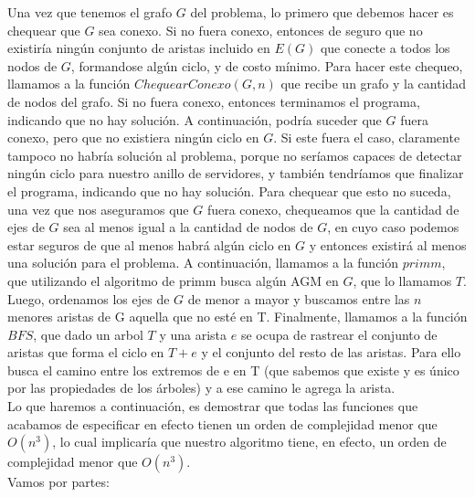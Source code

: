 \documentclass[11pt, a4paper, twoside]{article}
\begin{document}
Una vez que tenemos el grafo $G$ del problema, lo primero que debemos hacer es chequear que $G$
sea conexo. Si no fuera conexo, entonces de seguro que no existiría ningún conjunto de aristas
incluido en $E(G)$ que conecte a todos los nodos de $G$, formandose algún ciclo, y de costo 
mínimo. Para hacer este chequeo, llamamos a la función $ChequearConexo(G,n)$ que recibe un grafo
y la cantidad de nodos del grafo. Si no fuera conexo, entonces terminamos el programa, indicando
que no hay solución. A continuación, podría suceder que $G$ fuera conexo, pero que no existiera
ningún ciclo en $G$. Si este fuera el caso, claramente tampoco no habría solución al problema,
porque no seríamos capaces de detectar ningún ciclo para nuestro anillo de servidores, y también
tendríamos que finalizar el programa, indicando que no hay solución. Para 
chequear que esto no suceda, una vez que nos aseguramos que $G$ fuera conexo, chequeamos que
la cantidad de ejes de $G$ sea al menos igual a la cantidad de nodos de $G$, en cuyo caso podemos
estar seguros de que al menos habrá algún ciclo en $G$ y entonces existirá al menos una solución
para el problema. A continuación, llamamos a la función $primm$, que utilizando el algoritmo de
primm busca algún AGM en $G$, que lo llamamos $T$. Luego, ordenamos los ejes de $G$ de
menor a mayor y buscamos entre las $n$ menores aristas de G aquella que no esté en T. Finalmente, llamamos a la función $BFS$, que dado un arbol $T$ y una arista $e$ se ocupa de rastrear el conjunto de aristas que forma el ciclo en $T+e$ y el conjunto del resto de las aristas. Para ello busca el camino entre los extremos de e en T (que sabemos que existe y es único por las propiedades de los árboles) y a ese camino le agrega la arista.\\
Lo que haremos a continuación, es demostrar que todas las funciones que acabamos de especificar
en efecto tienen un orden de complejidad menor que $O(n^3)$, lo cual implicaría que nuestro
algoritmo tiene, en efecto, un orden de complejidad menor que $O(n^3)$. \\
Vamos por partes:
\end{document}
